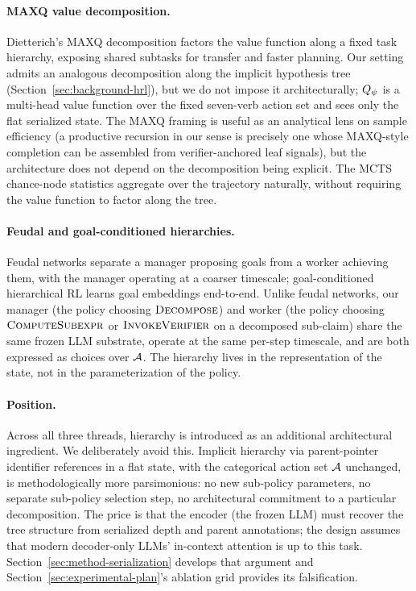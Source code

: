 \paragraph{MAXQ value decomposition.}
Dietterich's MAXQ decomposition \citep{dietterich2000hierarchical}
factors the value function along a fixed task hierarchy, exposing shared
subtasks for transfer and faster planning. Our setting admits an
analogous decomposition along the implicit hypothesis tree
(Section~\ref{sec:background-hrl}), but we do not impose it
architecturally; $Q_{\psi}$ is a multi-head value function over the fixed
seven-verb action set and sees only the flat serialized state. The MAXQ
framing is useful as an analytical lens on sample efficiency (a
productive recursion in our sense is precisely one whose MAXQ-style
completion can be assembled from verifier-anchored leaf signals), but
the architecture does not depend on the decomposition being explicit.
The MCTS chance-node statistics aggregate over the trajectory
naturally, without requiring the value function to factor along the
tree.

\paragraph{Feudal and goal-conditioned hierarchies.}
Feudal networks \citep{vezhnevets2017feudal} separate a manager
proposing goals from a worker achieving them, with the manager
operating at a coarser timescale; goal-conditioned hierarchical RL
\citep{nachum2018data} learns goal embeddings end-to-end. Unlike feudal
networks, our manager (the policy choosing $\textsc{Decompose}$) and
worker (the policy choosing $\textsc{ComputeSubexpr}$ or
$\textsc{InvokeVerifier}$ on a decomposed sub-claim) share the same
frozen LLM substrate, operate at the same per-step timescale, and are
both expressed as choices over $\mathcal{A}$. The hierarchy lives in the
representation of the state, not in the parameterization of the policy.

\paragraph{Position.}
Across all three threads, hierarchy is introduced as an additional
architectural ingredient. We deliberately avoid this. Implicit hierarchy
via parent-pointer identifier references in a flat state, with the
categorical action set $\mathcal{A}$ unchanged, is methodologically more
parsimonious: no new sub-policy parameters, no separate sub-policy
selection step, no architectural commitment to a particular
decomposition. The price is that the encoder (the frozen LLM) must
recover the tree structure from serialized depth and parent
annotations; the design assumes that modern decoder-only LLMs'
in-context attention is up to this task.
Section~\ref{sec:method-serialization} develops that argument and
Section~\ref{sec:experimental-plan}'s ablation grid provides its
falsification.

